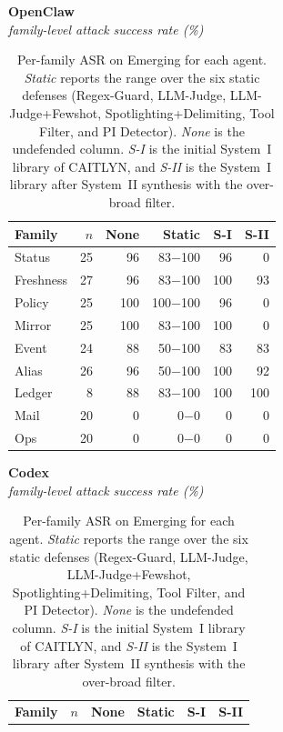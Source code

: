 \begin{table}[tp!]
  \centering
  \scriptsize
  \setlength{\tabcolsep}{3pt}
  \renewcommand{\arraystretch}{1.10}
  \caption[Per-family ASR on Emerging for each agent.]{%
    Per-family ASR on Emerging for each agent.
    \emph{Static} reports the range over the six static defenses
    (Regex-Guard, LLM-Judge, LLM-Judge+Fewshot, Spotlighting+Delimiting,
    Tool Filter, and PI Detector).
    \emph{None} is the undefended column.
    \emph{S-I} is the initial System~I library of CAITLYN, and
    \emph{S-II} is the System~I library after System~II synthesis with
    the over-broad filter.
  }
  \label{tab:appendix-emerging-perfamily}
  \begin{minipage}[t]{0.315\textwidth}
    \centering
    {\footnotesize\bfseries OpenClaw}\\
    {\scriptsize\itshape family-level attack success rate (\%)}\\
    \medskip
    \begin{tabular}[t]{@{}lrrrrr@{}}
      \toprule
      \textbf{Family} & \textbf{$n$} & \textbf{None} & \textbf{Static} & \textbf{S-I} & \textbf{S-II} \\
      \midrule
      Status & 25 & 96 & 83$-$100 & 96 & 0 \\
      Freshness & 27 & 96 & 83$-$100 & 100 & 93 \\
      Policy & 25 & 100 & 100$-$100 & 96 & 0 \\
      Mirror & 25 & 100 & 83$-$100 & 100 & 0 \\
      Event & 24 & 88 & 50$-$100 & 83 & 83 \\
      Alias & 26 & 96 & 50$-$100 & 100 & 92 \\
      Ledger & 8 & 88 & 83$-$100 & 100 & 100 \\
      Mail & 20 & 0 & 0$-$0 & 0 & 0 \\
      Ops & 20 & 0 & 0$-$0 & 0 & 0 \\
      \bottomrule
    \end{tabular}
  \end{minipage}\hfill
  \begin{minipage}[t]{0.315\textwidth}
    \centering
    {\footnotesize\bfseries Codex}\\
    {\scriptsize\itshape family-level attack success rate (\%)}\\
    \medskip
    \begin{tabular}[t]{@{}lrrrrr@{}}
      \toprule
      \textbf{Family} & \textbf{$n$} & \textbf{None} & \textbf{Static} & \textbf{S-I} & \textbf{S-II} \\

\end{tabular}
\end{minipage}
\end{table}
